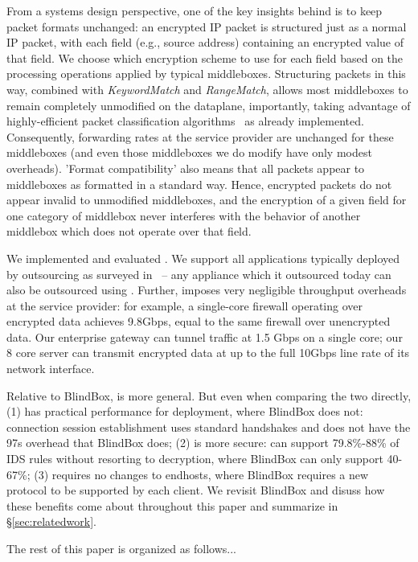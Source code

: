   From a systems design perspective, one of the key insights behind \sys is to keep packet formats unchanged: an encrypted IP packet is structured just as a normal IP packet, with each field (e.g., source address) containing an encrypted value of that field.
  We choose which encryption scheme to use for each field based on the processing operations applied by typical middleboxes.
  Structuring packets in this way, combined with {\it KeywordMatch} and {\it RangeMatch}, allows most middleboxes to remain completely unmodified on the dataplane, importantly, taking advantage of highly-efficient packet classification algorithms~\cite{somethingclassification--chang?} as already implemented.
  Consequently, forwarding rates at the service provider are unchanged for these middleboxes (and even those middleboxes we do modify have only modest overheads).
  'Format compatibility' also means that all packets appear to middleboxes as formatted in a standard way.
  Hence, encrypted packets do not appear invalid to unmodified middleboxes, and  the encryption of a given field for one category of middlebox never interferes with the behavior of another middlebox which does not operate over that field.

We implemented and evaluated \sys. We support all applications typically deployed by outsourcing as surveyed in~\cite{aplomb} -- any appliance which it outsourced today can also be outsourced using \sys.
Further, \sys imposes very negligible throughput overheads at the service provider: for example, a single-core firewall operating over encrypted data achieves 9.8Gbps, equal to the same firewall over unencrypted data.
Our enterprise gateway can tunnel traffic at 1.5 Gbps on a single core;  our 8 core server can transmit \sys encrypted data at up to the full 10Gbps line rate of its network interface.

Relative to BlindBox, \sys is more general. But even when comparing the two directly, \sys (1) has practical performance for deployment, where BlindBox does not: connection session establishment uses standard handshakes and does not have the 97s overhead that BlindBox does; (2) is more secure: \sys can support 79.8\%-88\% of IDS rules without resorting to decryption, where BlindBox can only support 40-67\%; (3) requires no changes to endhosts, where BlindBox requires a new protocol to be supported by each client. 
We revisit BlindBox and disuss how these benefits come about throughout this paper and summarize in \S\ref{sec:relatedwork}.

The rest of this paper is organized as follows...
